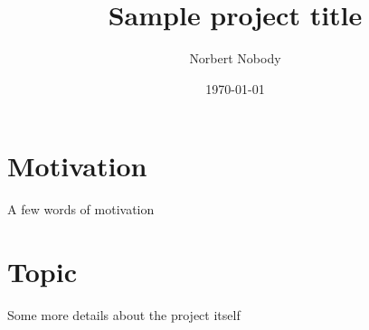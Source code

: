 \documentclass{projectproposal}
\title{Sample project title}
\author{Norbert Nobody}
\date{\today}
\begin{document}
	\maketitle

	\section*{Motivation}

	A few words of motivation

	\section*{Topic}

	Some more details about the project itself
\end{document}
